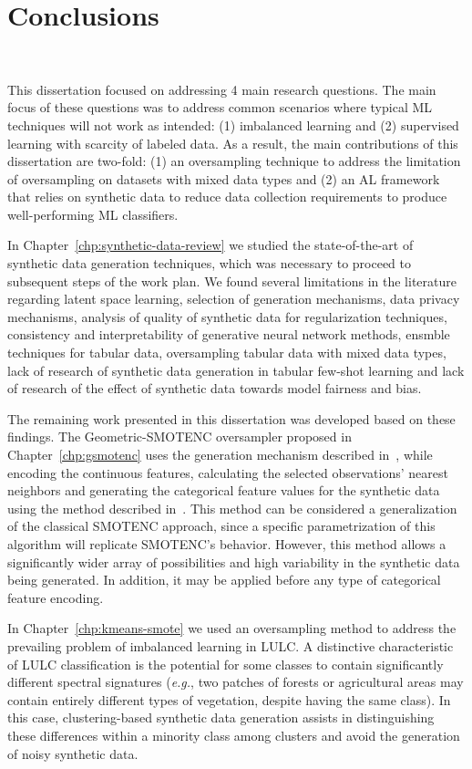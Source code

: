 \chapter{Conclusions}~\label{chp:conclusion}

This dissertation focused on addressing 4 main research questions. The main
focus of these questions was to address common scenarios where typical ML
techniques will not work as intended: (1) imbalanced learning and (2)
supervised learning with scarcity of labeled data. As a result, the main
contributions of this dissertation are two-fold: (1) an oversampling technique
to address the limitation of oversampling on datasets with mixed data types
and (2) an AL framework that relies on synthetic data to reduce data
collection requirements to produce well-performing ML classifiers.

In Chapter~\ref{chp:synthetic-data-review} we studied the state-of-the-art of
synthetic data generation techniques, which was necessary to proceed to subsequent
steps of the work plan. We found several limitations in the literature
regarding latent space learning, selection of generation mechanisms, data
privacy mechanisms, analysis of quality of synthetic data for regularization
techniques, consistency and interpretability of generative neural network
methods, ensmble techniques for tabular data, oversampling tabular data with
mixed data types, lack of research of synthetic data generation in tabular few-shot
learning and lack of research of the effect of synthetic data towards model
fairness and bias.

The remaining work presented in this dissertation was developed based on these
findings. The Geometric-SMOTENC oversampler proposed in
Chapter~\ref{chp:gsmotenc} uses the generation mechanism described
in~\cite{Douzas2019}, while encoding the continuous features, calculating the
selected observations' nearest neighbors and generating the categorical
feature values for the synthetic data using the method described
in~\cite{Chawla2002}. This method can be considered a generalization of the
classical SMOTENC approach, since a specific parametrization of this algorithm
will replicate SMOTENC's behavior. However, this method allows a significantly
wider array of possibilities and high variability in the synthetic data being
generated. In addition, it may be applied before any type of categorical
feature encoding.

In Chapter~\ref{chp:kmeans-smote} we used an oversampling method to address
the prevailing problem of imbalanced learning in LULC\@. A distinctive
characteristic of LULC classification is the potential for some classes to
contain significantly different spectral signatures (\textit{e.g.}, two
patches of forests or agricultural areas may contain entirely different types
of vegetation, despite having the same class). In this case, clustering-based
synthetic data generation assists in distinguishing these differences
within a minority class among clusters and avoid the generation of noisy
synthetic data.

